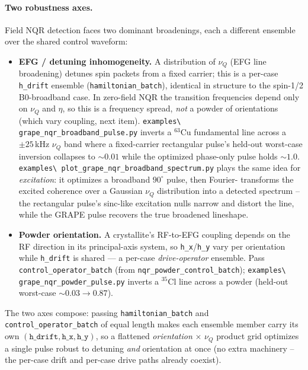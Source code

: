 \documentclass[11pt,oneside]{report}
\newcommand{\code}[1]{\texttt{#1}}
\begin{document}
\paragraph{Two robustness axes.} Field NQR detection faces two dominant
broadenings, each a different ensemble over the shared control waveform:
\begin{itemize}
  \item \textbf{EFG / detuning inhomogeneity.} A distribution of \(\nu_Q\)
  (EFG line broadening) detunes spin packets from a fixed carrier; this is a
  per-case \code{h\_drift} ensemble (\code{hamiltonian\_batch}), identical in
  structure to the spin-1/2 B0-broadband case. In zero-field NQR the transition
  frequencies depend only on \(\nu_Q\) and \(\eta\), so this is a frequency
  spread, \emph{not} a powder of orientations (which vary coupling, next item).
  \code{examples\textbackslash
  grape\_nqr\_broadband\_pulse.py} inverts a \(^{63}\)Cu fundamental line across
  a \(\pm 25\)\,kHz \(\nu_Q\) band where a fixed-carrier rectangular pulse's
  held-out worst-case inversion collapses to \(\sim 0.01\) while the optimized
  phase-only pulse holds \(\sim 1.0\). \code{examples\textbackslash
  plot\_grape\_nqr\_broadband\_spectrum.py} plays the same idea for
  \emph{excitation}: it optimizes a broadband \(90^\circ\) pulse, then Fourier-
  transforms the excited coherence over a Gaussian \(\nu_Q\) distribution into a
  detected spectrum -- the rectangular pulse's sinc-like excitation nulls narrow
  and distort the line, while the GRAPE pulse recovers the true broadened
  lineshape.
  \item \textbf{Powder orientation.} A crystallite's RF-to-EFG coupling depends
  on the RF direction in its principal-axis system, so \code{h\_x}/\code{h\_y}
  vary per orientation while \code{h\_drift} is shared --- a per-case
  \emph{drive-operator} ensemble. Pass \code{control\_operator\_batch}
  (from \code{nqr\_powder\_control\_batch}); \code{examples\textbackslash
  grape\_nqr\_powder\_pulse.py} inverts a \(^{35}\)Cl line across a powder
  (held-out worst-case \(\sim 0.03 \to 0.87\)).
\end{itemize}

The two axes compose: passing \code{hamiltonian\_batch} and
\code{control\_operator\_batch} of equal length makes each ensemble member carry
its own \((\code{h\_drift}, \code{h\_x}, \code{h\_y})\), so a flattened
\emph{orientation} \(\times\) \(\nu_Q\) product grid optimizes a single pulse
robust to detuning \emph{and} orientation at once (no extra machinery -- the
per-case drift and per-case drive paths already coexist).
\end{document}
